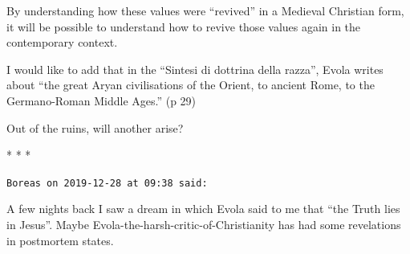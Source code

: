By understanding how these values were ``revived'' in a Medieval Christian form, it will be possible to understand how to revive those values again in the contemporary context.

I would like to add that in the ``Sintesi di dottrina della razza'', Evola writes about ``the great Aryan civilisations of the Orient, to ancient Rome, to the Germano-Roman Middle Ages.'' (p 29)

Out of the ruins, will another arise?



\begin{center}* * *\end{center}

\begin{footnotesize}
\begin{sffamily}

\texttt{Boreas on 2019-12-28 at 09:38 said:}

A few nights back I saw a dream in which Evola said to me that ``the Truth lies in Jesus''. Maybe Evola-the-harsh-critic-of-Christianity has had some revelations in postmortem states.

\hfill

\end{sffamily}
\end{footnotesize}

